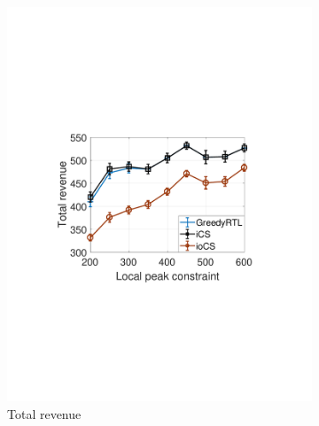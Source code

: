 \documentclass[journal]{IEEEtran}
\newcommand{\revv}[1]{{\color{black}#1}}%
\begin{document}
			\begin{figure}[t!]	
				\centering
				\begin{subfigure}[b]{0.25\textwidth}
					\begin{center}
						\includegraphics[width=\textwidth]{v-c.pdf}
						\caption{\revv{Total revenue}}
						\label{fig:v-c}
					\end{center}
				\end{subfigure}%
				\begin{subfigure}[b]{0.25\textwidth}
					\begin{center}

\end{center}
\end{subfigure}
\end{figure}
\end{document}
